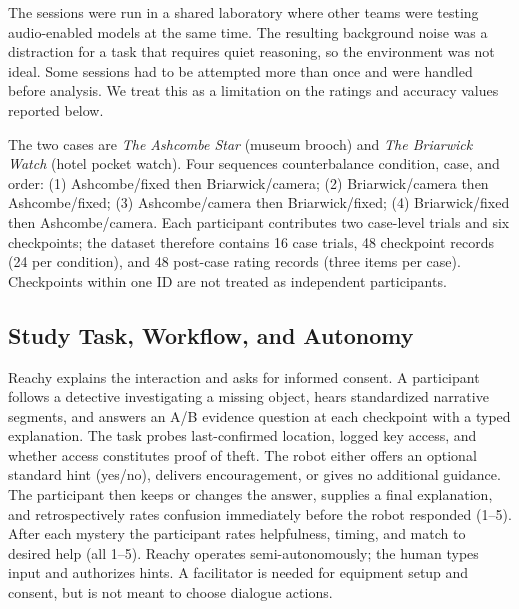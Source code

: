 \documentclass[conference]{IEEEtran}
\begin{document}
The sessions were run in a shared laboratory where other teams were testing audio-enabled models at the same time. The resulting background noise was a distraction for a task that requires quiet reasoning, so the environment was not ideal. Some sessions had to be attempted more than once and were handled before analysis. We treat this as a limitation on the ratings and accuracy values reported below.

The two cases are \emph{The Ashcombe Star} (museum brooch) and \emph{The Briarwick Watch} (hotel pocket watch). Four sequences counterbalance condition, case, and order: (1) Ashcombe/fixed then Briarwick/camera; (2) Briarwick/camera then Ashcombe/fixed; (3) Ashcombe/camera then Briarwick/fixed; (4) Briarwick/fixed then Ashcombe/camera. Each participant contributes two case-level trials and six checkpoints; the dataset therefore contains 16 case trials, 48 checkpoint records (24 per condition), and 48 post-case rating records (three items per case). Checkpoints within one ID are not treated as independent participants.

\subsection{Study Task, Workflow, and Autonomy}
Reachy explains the interaction and asks for informed consent. A participant follows a detective investigating a missing object, hears standardized narrative segments, and answers an A/B evidence question at each checkpoint with a typed explanation. The task probes last-confirmed location, logged key access, and whether access constitutes proof of theft. The robot either offers an optional standard hint (yes/no), delivers encouragement, or gives no additional guidance. The participant then keeps or changes the answer, supplies a final explanation, and retrospectively rates confusion immediately before the robot responded (1--5). After each mystery the participant rates helpfulness, timing, and match to desired help (all 1--5). Reachy operates semi-autonomously; the human types input and authorizes hints. A facilitator is needed for equipment setup and consent, but is not meant to choose dialogue actions.
\end{document}
